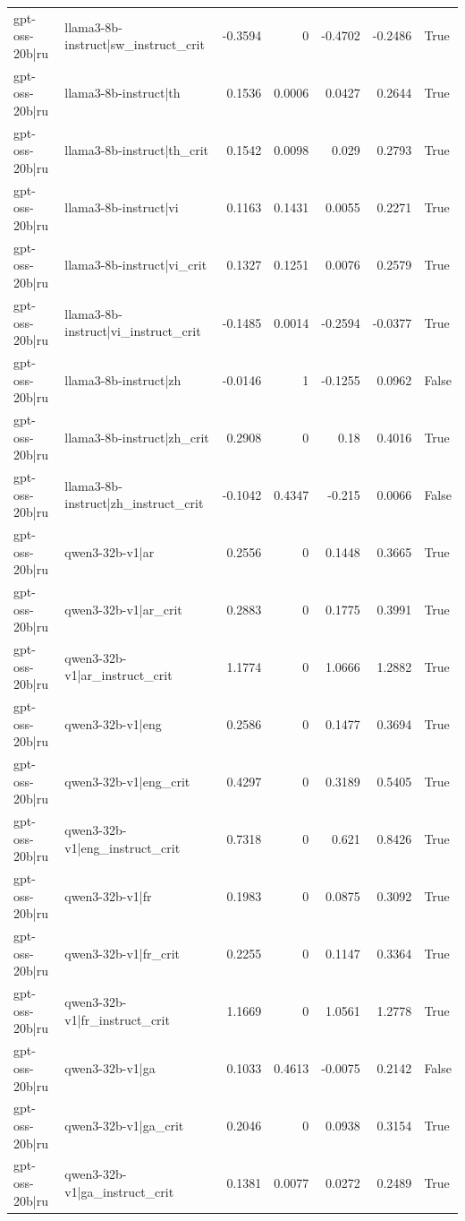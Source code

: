 \begin{table}
\begin{tabular}{l l r r r r l}
gpt-oss-20b|ru & llama3-8b-instruct|sw_instruct_crit & -0.3594 & 0 & -0.4702 & -0.2486 & True \\
gpt-oss-20b|ru & llama3-8b-instruct|th & 0.1536 & 0.0006 & 0.0427 & 0.2644 & True \\
gpt-oss-20b|ru & llama3-8b-instruct|th_crit & 0.1542 & 0.0098 & 0.029 & 0.2793 & True \\
gpt-oss-20b|ru & llama3-8b-instruct|vi & 0.1163 & 0.1431 & 0.0055 & 0.2271 & True \\
gpt-oss-20b|ru & llama3-8b-instruct|vi_crit & 0.1327 & 0.1251 & 0.0076 & 0.2579 & True \\
gpt-oss-20b|ru & llama3-8b-instruct|vi_instruct_crit & -0.1485 & 0.0014 & -0.2594 & -0.0377 & True \\
gpt-oss-20b|ru & llama3-8b-instruct|zh & -0.0146 & 1 & -0.1255 & 0.0962 & False \\
gpt-oss-20b|ru & llama3-8b-instruct|zh_crit & 0.2908 & 0 & 0.18 & 0.4016 & True \\
gpt-oss-20b|ru & llama3-8b-instruct|zh_instruct_crit & -0.1042 & 0.4347 & -0.215 & 0.0066 & False \\
gpt-oss-20b|ru & qwen3-32b-v1|ar & 0.2556 & 0 & 0.1448 & 0.3665 & True \\
gpt-oss-20b|ru & qwen3-32b-v1|ar_crit & 0.2883 & 0 & 0.1775 & 0.3991 & True \\
gpt-oss-20b|ru & qwen3-32b-v1|ar_instruct_crit & 1.1774 & 0 & 1.0666 & 1.2882 & True \\
gpt-oss-20b|ru & qwen3-32b-v1|eng & 0.2586 & 0 & 0.1477 & 0.3694 & True \\
gpt-oss-20b|ru & qwen3-32b-v1|eng_crit & 0.4297 & 0 & 0.3189 & 0.5405 & True \\
gpt-oss-20b|ru & qwen3-32b-v1|eng_instruct_crit & 0.7318 & 0 & 0.621 & 0.8426 & True \\
gpt-oss-20b|ru & qwen3-32b-v1|fr & 0.1983 & 0 & 0.0875 & 0.3092 & True \\
gpt-oss-20b|ru & qwen3-32b-v1|fr_crit & 0.2255 & 0 & 0.1147 & 0.3364 & True \\
gpt-oss-20b|ru & qwen3-32b-v1|fr_instruct_crit & 1.1669 & 0 & 1.0561 & 1.2778 & True \\
gpt-oss-20b|ru & qwen3-32b-v1|ga & 0.1033 & 0.4613 & -0.0075 & 0.2142 & False \\
gpt-oss-20b|ru & qwen3-32b-v1|ga_crit & 0.2046 & 0 & 0.0938 & 0.3154 & True \\
gpt-oss-20b|ru & qwen3-32b-v1|ga_instruct_crit & 0.1381 & 0.0077 & 0.0272 & 0.2489 & True \\

\end{tabular}
\end{table}

